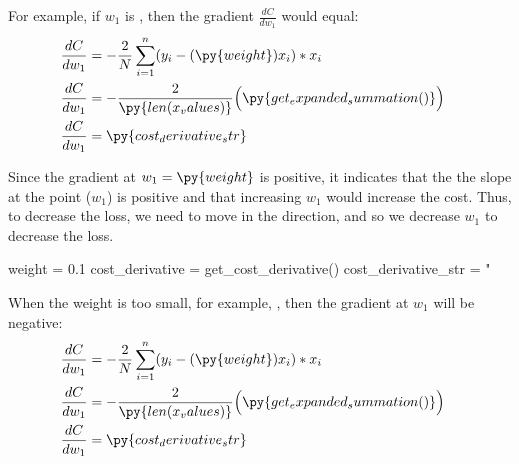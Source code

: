\documentclass[12pt, demo]{article}
\begin{document}

For example, if $w_1$ is , then the gradient $\frac{dC}{dw_1}$ would equal:
\begin{align*}
	\frac{dC}{dw_1} & = -\frac{2}{N} \sum_{i=1}^{n} (y_i - (\py{weight})x_i) * x_i
	\\
	\frac{dC}{dw_1} & =
	\begin{aligned}[t]
		-\frac{2}{\py{len(x_values)}}
		\Big( & \py{get_expanded_summation()}\Big)
	\end{aligned}
	\\
	\frac{dC}{dw_1} & = \py{cost_derivative_str}
\end{align*}

Since the gradient at $w_1 = \py{weight}$ is positive, it indicates that the the slope at the point ($w_1$) is positive and that increasing $w_1$ would increase the cost. Thus, to decrease the loss, we need to move in the direction, and so we decrease $w_1$ to decrease the loss.

\begin{pycode}
weight = 0.1
cost_derivative = get_cost_derivative()
cost_derivative_str = "%
\end{pycode}

When the weight is too small, for example, , then the gradient at $w_1$ will be negative:
\begin{align*}
	\frac{dC}{dw_1} & = -\frac{2}{N} \sum_{i=1}^{n} (y_i - (\py{weight})x_i) * x_i
	\\
	\frac{dC}{dw_1} & =
	\begin{aligned}[t]
		-\frac{2}{\py{len(x_values)}}
		\Big( & \py{get_expanded_summation()}\Big)
	\end{aligned}
	\\
	\frac{dC}{dw_1} & = \py{cost_derivative_str}
\end{align*}
\end{document}
